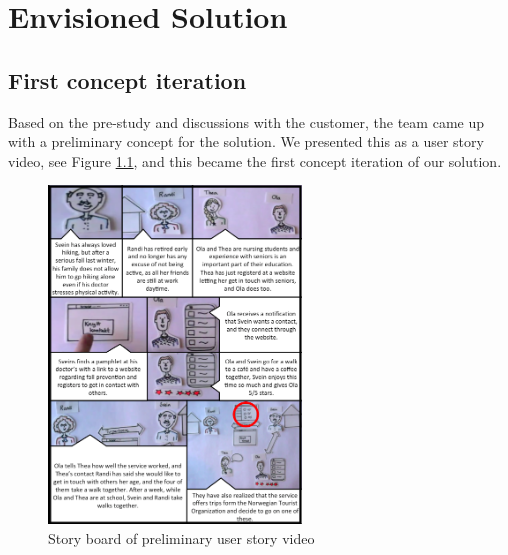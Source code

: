 \chapter{Envisioned Solution}
\section{First concept iteration}
Based on the pre-study and discussions with the customer, the team came up with a preliminary concept for the solution. We presented this as a user story video, see Figure \ref{fig:preVideo}, and this became the first concept iteration of our solution.

\begin{figure}[H]
\centering
\includegraphics[width = 0.60\textwidth]{Figures/UserFilm1}
\caption{Story board of preliminary user story video}
    \label{fig:preVideo}
    \end{figure}